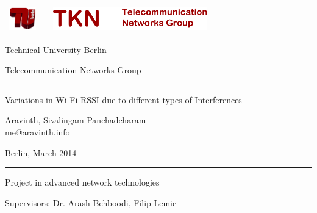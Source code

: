 \documentclass[11pt,a4paper,headinclude,footinclude,chapterprefix=on]{scrreprt}
\makeatletter
\newcommand{\trnumber}{TKN-14}
\newcommand{\trdate}{March 2014}
\newcommand{\trauthor}{Aravinth, Sivalingam Panchadcharam}
\newcommand{\tremail}{me@aravinth.info}
\newcommand{\trtitle}{Variations in Wi-Fi RSSI due to different types of Interferences}
\makeatother
\begin{document}


{ \sffamily

\thispagestyle{empty} 
\begin{tabularx}
	{\columnwidth}{cXc} 
	\includegraphics[height=1cm]{Images/TU-Logo-3D-rot.pdf} & & 
	\includegraphics[height=1cm]{Images/tknlogo.pdf} \\
\end{tabularx}

\vspace{1.0cm} 
\begin{center}
	{\huge 
	\noindent Technical University Berlin
	
	\vspace{0.5cm}
	
	\noindent Telecommunication Networks Group 
	\begin{center}
		\rule{15.5cm}{0.4pt} 
	\end{center}
	} 
\end{center}
\begin{minipage}
	[][11.0cm][c]{14.5cm} {\Huge 
	\begin{center}
		\trtitle 
	\end{center}
	\begin{center}
		\trauthor \\
		{\Large \tremail} 
	\end{center}
	\begin{center}
		Berlin, \trdate 
	\end{center}
	
	\vspace{0.5cm}
	
	}
	
\end{minipage}

\setlength{\fboxrule}{0.4pt} \setlength{\fboxsep}{0.4pt} 
\begin{center}
	
	\rule{15.5cm}{0.4pt}
	
	\vspace{0.5cm}
	
	{\huge {Project in advanced network technologies}}
	
	\vspace{0.5cm}
	
	{\huge Supervisors: Dr. Arash Behboodi, Filip Lemic}
	
	\vspace{0.5cm} 
\end{center}
}
\end{document}
